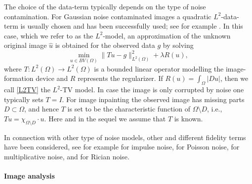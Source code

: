 \documentclass[enabledeprecatedfontcommands,cleardoublepage=empty,headsepline,twoside,11pt,DIV=15,BCOR=12mm,final]{scrartcl}
\begin{document}
The choice of the data-term typically depends on the type of noise contamination. For Gaussian noise contaminated images a quadratic $L^2$-data-term is usually chosen and has been successfully used; see for example \cite{Cha, ChaDar, ChaLio, ChaGolMul, ComWaj, DarSig05, DarSig06, DauTesVes, DobVog, GolOsh, HinSta, Nes, OshBurGolXuYin, WeiBlaAub}. In this case, which we refer to as the $L^2$-model, an approximation of the unknown original image $\hat{u}$ is obtained for the observed data $g$ by solving 
\begin{equation}\label{L2TV}
\min_{u\in BV(\Omega)} \|Tu-g\|_{L^2(\Omega)}^2 + \lambda R(u),
\end{equation}
where $T : L^2(\Omega) \to L^2(\Omega)$ is a bounded linear operator modelling the image-formation device and $R$ represents the regularizer. If $R(u)=\int_\Omega |Du|$, then we call \eqref{L2TV} the $L^2$-TV model. In case the image is only corrupted by noise one typically sets $T=I$. For image inpainting the observed image has missing parts $D\subset \Omega$, and hence $T$ is set to be the characteristic function of $\Omega\setminus D$, i.e., $Tu=\chi_{\Omega\setminus D}\cdot u$. %
 Here and in the sequel we assume that $T$ is known.

In connection with other type of noise models, other and different fidelity terms have been considered, see for example \cite{} for impulse noise, \cite{} for Poisson noise, \cite{} for multiplicative noise, and \cite{} for Rician noise.

\paragraph{Image analysis}
\end{document}
